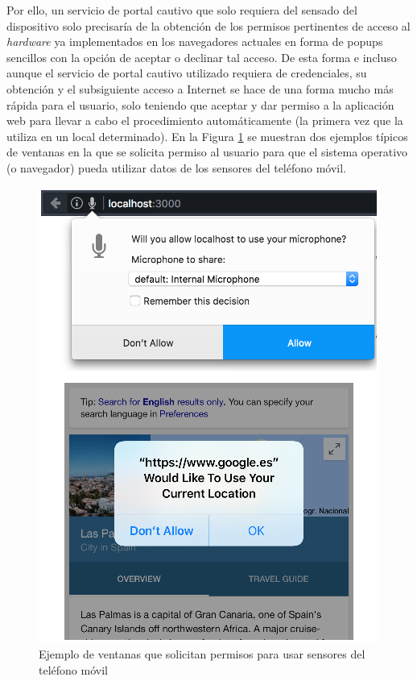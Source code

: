 Por ello, un servicio de portal cautivo que solo requiera del sensado del dispositivo solo precisaría de la obtención de los permisos pertinentes de acceso al \emph{hardware} ya implementados en los navegadores actuales en forma de popups sencillos con la opción de aceptar o declinar tal acceso. De esta forma e incluso aunque el servicio de portal cautivo utilizado requiera de credenciales, su obtención y el subsiguiente acceso a Internet se hace de una forma mucho más rápida para el usuario, solo teniendo que aceptar y dar permiso a la aplicación web para llevar a cabo el procedimiento automáticamente (la primera vez que la utiliza en un local determinado). En la Figura \ref{LocationMicPermissions} se muestran dos ejemplos típicos de ventanas en la que se solicita permiso al usuario para que el sistema operativo (o navegador) pueda utilizar datos de los sensores del teléfono móvil.

\begin{figure}[!t]
\begin{center}
\includegraphics[width=0.75\linewidth]{./2_SensadoCol/Img/LocationMicPermissions.png}
\end{center}
\caption{Ejemplo de ventanas que solicitan permisos para usar sensores del teléfono móvil}
\label{LocationMicPermissions}
\end{figure}

